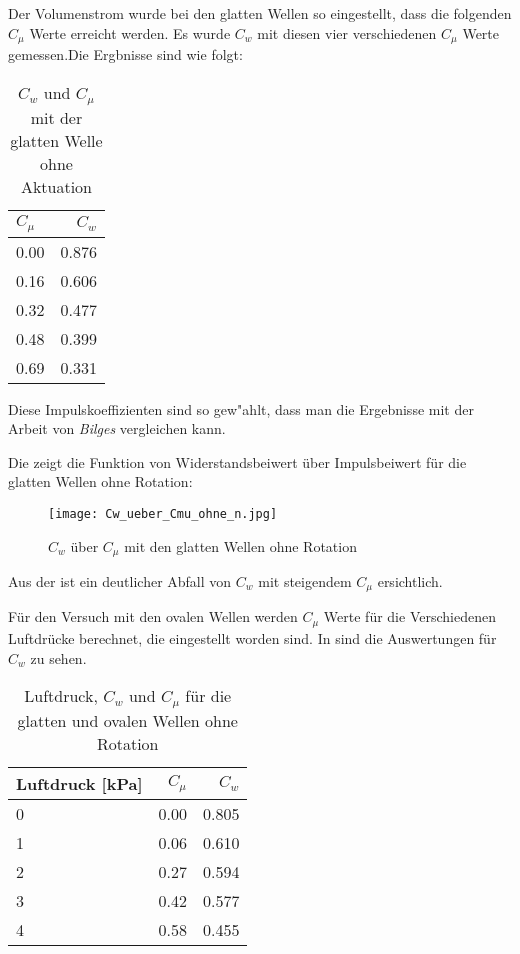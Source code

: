 Der Volumenstrom wurde bei den glatten Wellen so eingestellt, dass
die folgenden $C_{\mu}$  Werte erreicht werden. Es wurde $C_{w}$ mit diesen vier verschiedenen $C_{\mu}$ Werte gemessen.Die Ergbnisse sind wie folgt:
\begin{table}[H]
	\centering
	\begin{tabular}{lr}
		\toprule
		$C_{\mu}$ & $C_{w}$ \\
		\midrule
		0.00 & 0.876\\
		0.16 & 0.606\\
		0.32 & 0.477\\
		0.48 & 0.399\\
		0.69 & 0.331\\
		\bottomrule
	\end{tabular}
	\caption{$C_{w}$ und $C_{\mu}$ mit der glatten Welle ohne Aktuation }
	\label{tab:Cw-Cmu_Kon1}
\end{table}
Diese Impulskoeffizienten sind so gew"ahlt, dass man die Ergebnisse mit der Arbeit von \textit{Bilges} vergleichen kann.

Die  zeigt die Funktion von Widerstandsbeiwert \"uber Impulsbeiwert f\"ur die glatten Wellen ohne Rotation:
\begin{figure}[h]
	\centering
	\texttt{[image: Cw\_ueber\_Cmu\_ohne\_n.jpg]}
	\caption{$C_{w}$  \"uber $C_{\mu}$ mit den glatten Wellen ohne Rotation }
	\label{fig:Cw-Cmu_Konf1}
\end{figure}

Aus der  ist ein deutlicher Abfall von $C_{w}$ mit steigendem $C_{\mu}$ ersichtlich.

F\"ur den Versuch mit den ovalen Wellen werden  $C_{\mu}$ Werte f\"ur die Verschiedenen Luftdr\"ucke berechnet, die eingestellt worden sind. In  sind die Auswertungen f\"ur $C_{w}$ zu sehen. 
\begin{table}[h]
	\centering
	\begin{tabular}{lrr}
		\toprule
		Luftdruck [kPa] & $C_{\mu}$ & $C_{w}$ \\
		\midrule
		0 & 0.00 & 0.805\\
		1 & 0.06 & 0.610\\
		2 & 0.27 & 0.594\\
		3 & 0.42 & 0.577\\
		4 & 0.58 & 0.455\\
		\bottomrule
	\end{tabular}\\
	\caption{Luftdruck, $C_{w}$  und $C_{\mu}$ f\"ur die glatten und ovalen Wellen ohne Rotation}
	\label{tab:Cw-Cmu_Konf1+2}
\end{table}

